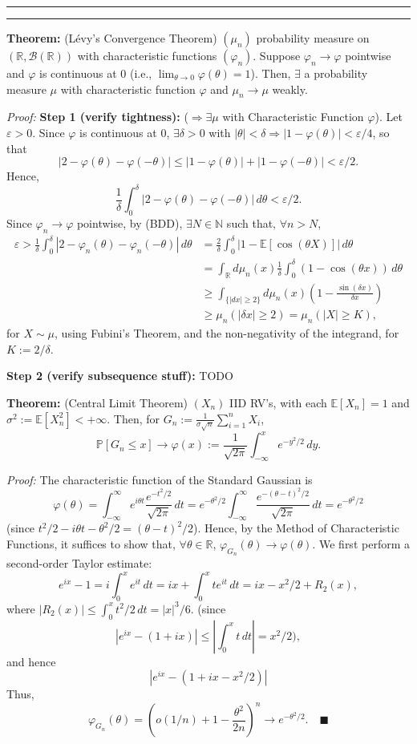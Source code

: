 \documentclass[11pt]{article}
\newcounter{questionCounter}
\newcounter{partCounter}[questionCounter]
\newenvironment{question}[2][\arabic{questionCounter}]{%
    \setcounter{partCounter}{0}%
    \vspace{.25in} \hrule \vspace{0.5em}%
        \noindent{\bf #2}%
    \vspace{0.8em} \hrule \vspace{.10in}%
    \addtocounter{questionCounter}{1}%
}{}
\renewcommand{\qed}{\quad \ensuremath{\blacksquare}}
\renewcommand{\phi}{\varphi}
\newcommand{\E}{\mathbb{E}} %
\newcommand{\N}{\mathbb{N}} %
\newcommand{\R}{\mathbb{R}} %
\newcommand{\B}{\mathcal{B}} %
\newcommand{\e}{\varepsilon} %
\renewcommand{\P}{\mathbb{P}}   %
\begin{document}
\begin{question}{4/21/14: Characteristic Functions}
{\bf Theorem:} (L\'evy's Convergence Theorem) $(\mu_n)$ probability
measure on $(\R,\B(\R))$ with characteristic functions $(\phi_n)$. Suppose
$\phi_n \to \phi$ pointwise and $\phi$ is continuous at $0$ (i.e.,
$\lim_{\theta \to 0} \phi(\theta) = 1$). Then, $\exists$ a probability measure
$\mu$ with characteristic function $\phi$ and $\mu_n \to \mu$ weakly.

\emph{Proof:} {\bf Step 1 (verify tightness):} ($\Rightarrow \exists \mu$ with
Characteristic Function $\phi$). Let $\e > 0$. Since $\phi$ is continuous at
$0$, $\exists \delta > 0$ with $|\theta| < \delta \Rightarrow
|1 - \phi(\theta)| < \e/4$, so that
\[|2 - \phi(\theta) - \phi(-\theta)|
    \leq |1 - \phi(\theta)| + |1 - \phi(-\theta)|
    < \e/2.\]
Hence,
\[\frac{1}{\delta} \int_0^\delta |2 - \phi(\theta) - \phi(-\theta)| \, d\theta
    < \e/2.\]
Since $\phi_n \to \phi$ pointwise, by (BDD), $\exists N \in \N$ such that,
$\forall n > N$,
\begin{align*}
\e >
    \frac{1}{\delta} \int_0^\delta |2 - \phi_n(\theta) - \phi_n(-\theta)|
                                                                    \, d\theta
 &  = \frac{2}{\delta} \int_0^\delta |1 - \E[\cos(\theta X)]| \, d\theta    \\
 &  = \int_{\R} d\mu_n(x) \frac{1}{\delta}
        \int_0^\delta \left( 1 - \cos(\theta x) \right) \, d\theta \\
 &  \geq \int_{\{|dx| \geq 2\}} d\mu_n(x)
        \left( 1 - \frac{\sin(\delta x)}{\delta x} \right)  \\
 &  \geq \mu_n(|\delta x| \geq 2)
    = \mu_n(|X| \geq K),
\end{align*}
for $X \sim \mu$, using Fubini's Theorem, and the non-negativity of the
integrand, for $K := 2/\delta$.

{\bf Step 2 (verify subsequence stuff):} TODO %

{\bf Theorem:} (Central Limit Theorem) $(X_n)$ IID RV's, with each
$\E[X_n] = 1$ and $\sigma^2 := \E[X_n^2] < +\infty$. Then, for
$G_n := \frac{1}{\sigma\sqrt{n}} \sum_{i = 1}^n X_i$,
\[\P[G_n \leq x]
    \to \phi(x)
    := \frac{1}{\sqrt{2\pi}}\int_{-\infty}^x e^{-y^2/2} \, dy.
\]

\emph{Proof:} The characteristic function of the Standard Gaussian is
\[\phi(\theta)
    = \int_{-\infty}^\infty e^{i\theta t} \frac{e^{-t^2/2}}{\sqrt{2\pi}} \, dt
    = e^{-\theta^2/2}
        \int_{-\infty}^\infty \frac{e^{-(\theta - t)^2/2}}{\sqrt{2\pi}} \, dt
    = e^{-\theta^2/2}
\]
(since $t^2/2 - i\theta t - \theta^2/2 = (\theta - t)^2/2$). Hence, by the
Method of Characteristic Functions, it suffices to show that,
$\forall \theta \in \R$, $\phi_{G_n}(\theta) \to \phi(\theta)$.
We first perform a second-order Taylor estimate:
\[e^{ix} - 1
    = i\int_0^x e^{it} \, dt
    = ix + \int_0^x t e^{it} \, dt
    = ix - x^2/2 + R_2(x),
\]
where $|R_2(x)| \leq \int_0^x t^2/2 \, dt = |x|^3/6$.
(since
\[|e^{ix} - (1 + ix)| \leq \left| \int_0^x t \,dt \right| = x^2/2),\]
and hence
\[|e^{ix} - (1 + ix - x^2/2)|\]
Thus,
\[\phi_{G_n}(\theta)
    = \left( o(1/n) + 1 - \frac{\theta^2}{2n} \right)^n
    \to e^{-\theta^2/2}. \qed
\]
\end{question}
\end{document}
